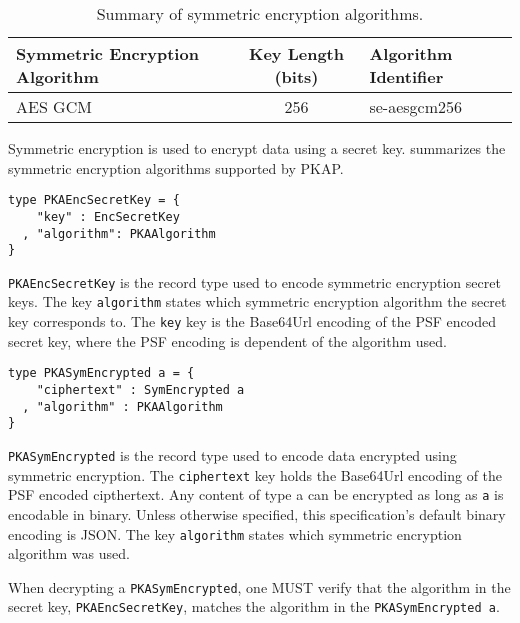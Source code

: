\documentclass{article}
\newcommand{\pkap}{PKAP}
\begin{document}
\begin{table}
\begin{center}
\begin{tabular}{| l | c | l |}
\hline
Symmetric Encryption Algorithm & Key Length (bits) & Algorithm Identifier \\ 
\hline
AES GCM & 256 & se-aesgcm256 \\
\hline
\end{tabular}
\end{center}
\caption{Summary of symmetric encryption algorithms.}
\label{table:symmetric_enc_alg}
\end{table}

Symmetric encryption is used to encrypt data using a secret key.  summarizes the symmetric encryption algorithms supported by \pkap{}. 

\begin{lstlisting}
type PKAEncSecretKey = {
    "key" : EncSecretKey
  , "algorithm": PKAAlgorithm
}
\end{lstlisting}

\texttt{PKAEncSecretKey} is the record type used to encode symmetric encryption secret keys. The key \texttt{algorithm} states which symmetric encryption algorithm the secret key corresponds to. The \texttt{key} key is the Base64Url encoding of the PSF encoded secret key, where the PSF encoding is dependent of the algorithm used. 

\begin{lstlisting}
type PKASymEncrypted a = {
    "ciphertext" : SymEncrypted a
  , "algorithm" : PKAAlgorithm
}
\end{lstlisting}

\label{type-PKASymEncrypted}
\texttt{PKASymEncrypted} is the record type used to encode data encrypted using symmetric encryption. The \texttt{ciphertext} key holds the Base64Url encoding of the PSF encoded cipthertext. Any content of type a can be encrypted as long as \texttt{a} is encodable in binary. Unless otherwise specified, this specification's default binary encoding is JSON. The key \texttt{algorithm} states which symmetric encryption algorithm was used. 

When decrypting a \texttt{PKASymEncrypted}, one MUST verify that the algorithm in the secret key, \texttt{PKAEncSecretKey}, matches the algorithm in the \texttt{PKASymEncrypted a}.
\end{document}
